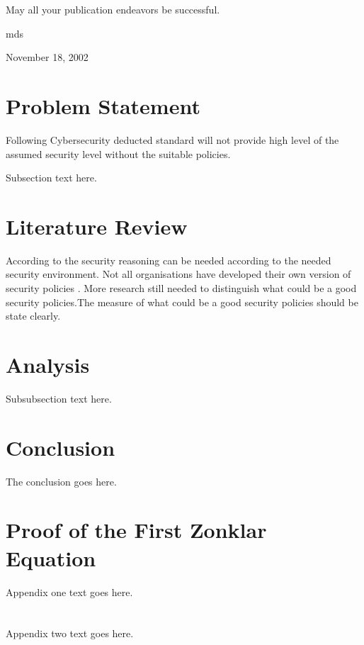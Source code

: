 \documentclass[journal]{IEEEtran}
\begin{document}
May all your publication endeavors be successful.

\hfill mds

\hfill November 18, 2002

\section{Problem Statement}
Following Cybersecurity deducted standard will not provide high level
of the assumed security level without the suitable policies.

Subsection text here.



\section{Literature Review}
According to \cite{glasgow1992logic} the security reasoning can be needed according to the needed security environment. 
Not all organisations have developed their own version of security policies \cite{paananen2020state}. More research 
still needed to distinguish what could be a good security policies.The measure of what could be a good security policies 
should be state clearly.


\section{Analysis}
Subsubsection text here.


\section{Conclusion}
The conclusion goes here.

\appendices
\section{Proof of the First Zonklar Equation}
Appendix one text goes here.

\section{}
Appendix two text goes here.




\end{document}
